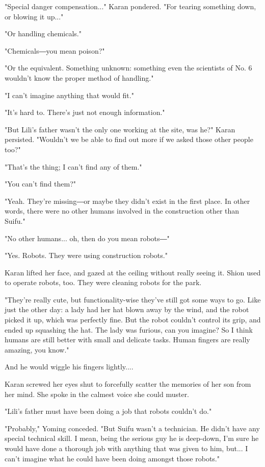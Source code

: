"Special danger compensation..." Karan pondered. "For tearing something
down, or blowing it up..."

"Or handling chemicals."

"Chemicals―you mean poison?"

"Or the equivalent. Something unknown: something even the scientists of
No. 6 wouldn't know the proper method of handling."

"I can't imagine anything that would fit."

"It's hard to. There's just not enough information."

"But Lili's father wasn't the only one working at the site, was he?"
Karan persisted. "Wouldn't we be able to find out more if we asked those
other people too?"

"That's the thing; I can't find any of them."

"You can't find them?"

"Yeah. They're missing―or maybe they didn't exist in the first place. In
other words, there were no other humans involved in the construction
other than Suifu."

"No other humans... oh, then do you mean robots―"

"Yes. Robots. They were using construction robots."

Karan lifted her face, and gazed at the ceiling without really seeing
it. Shion used to operate robots, too. They were cleaning robots for the
park.

"They're really cute, but functionality-wise they've still got some ways
to go. Like just the other day: a lady had her hat blown away by the
wind, and the robot picked it up, which was perfectly fine. But the
robot couldn't control its grip, and ended up squashing the hat. The
lady was furious, can you imagine? So I think humans are still better
with small and delicate tasks. Human fingers are really amazing, you
know."

And he would wiggle his fingers lightly....

Karan screwed her eyes shut to forcefully scatter the memories of her
son from her mind. She spoke in the calmest voice she could muster.

"Lili's father must have been doing a job that robots couldn't do."

"Probably," Yoming conceded. "But Suifu wasn't a technician. He didn't
have any special technical skill. I mean, being the serious guy he is
deep-down, I'm sure he would have done a thorough job with anything that
was given to him, but... I can't imagine what he could have been doing
amongst those robots."

